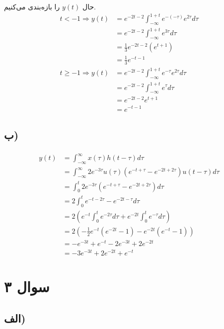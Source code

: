 \documentclass{article}
\begin{document}
	حال
	$y(t)$
	را بازه‌بندی می‌کنیم.
	\begin{align*}
		t < -1 \Rightarrow y(t) &= e^{-2t-2} \int_{-\infty}^{1+t} e^{-(-\tau)} e^{2\tau} d \tau \\
		&= e^{-2t-2} \int_{-\infty}^{1+t} e^{3\tau} d \tau \\
		&= \frac{1}{3} e^{-2t-2} (e^{t+1}) \\
		&= \frac{1}{3} e^{-t-1} \\
		t \ge -1 \Rightarrow y(t) &= e^{-2t-2} \int_{-\infty}^{1+t} e^{-\tau} e^{2\tau} d \tau \\
		&= e^{-2t-2} \int_{-\infty}^{1+t} e^{\tau} d \tau \\
		&= e^{-2t-2} e^{t+1} \\
		&= e^{-t-1}
	\end{align*}

	\subsection*{ب)}
	\paragraph*{}

	\begin{align*}
		y(t) &= \int_{-\infty}^{\infty} x(\tau) h(t-\tau) d \tau \\
		&= \int_{-\infty}^{\infty} 2e^{-3 \tau} u(\tau) (e^{-t+\tau} - e^{-2t + 2\tau}) u(t - \tau) d\tau \\
		&= \int_{0}^{t} 2e^{-3 \tau} (e^{-t+\tau} - e^{-2t + 2\tau}) d\tau \\
		&= 2 \int_{0}^{t} e^{-t-2\tau} - e^{-2t - \tau} d\tau \\
		&= 2(e^{-t} \int_{0}^{t} e^{-2\tau} d\tau + e^{-2t} \int_{0}^{t} e^{-\tau} d\tau) \\
		&= 2(-\frac{1}{2} e^{-t} (e^{-2t}-1) - e^{-2t} (e^{-t} - 1)) \\
		&= -e^{-3t} + e^{-t} - 2e^{-3t} + 2e^{-2t} \\
		&= -3e^{-3t} + 2e^{-2t} + e^{-t}
	\end{align*}

	\section*{سوال ۳}
	\subsection*{الف)}
	\paragraph*{}
\end{document}
